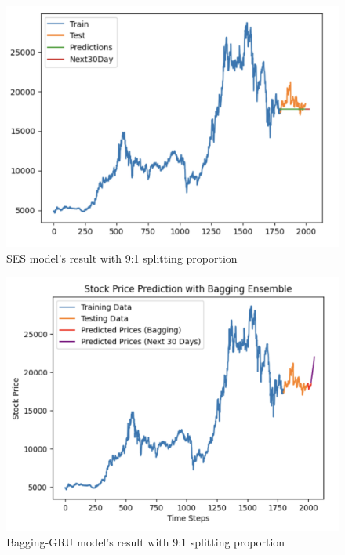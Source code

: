 \documentclass{ieeeojies}
\begin{document}
\begin{figure}[H]
  \centering
  \begin{minipage}{0.8\linewidth}
    \centering
    \includegraphics[width=\linewidth]{bibliography/ETS_MBB91.png}
    \caption{SES model's result with 9:1 splitting proportion}
    \label{fig21}
  \end{minipage}
\end{figure}
\begin{figure}[H]
  \centering
  \begin{minipage}{0.8\linewidth}
    \centering
    \includegraphics[width=\linewidth]{bibliography/baggingGRU_MBB.png}
    \caption{Bagging-GRU model's result with 9:1 splitting proportion}
    \label{mbbbggg}
  \end{minipage}
\end{figure}
\end{document}
